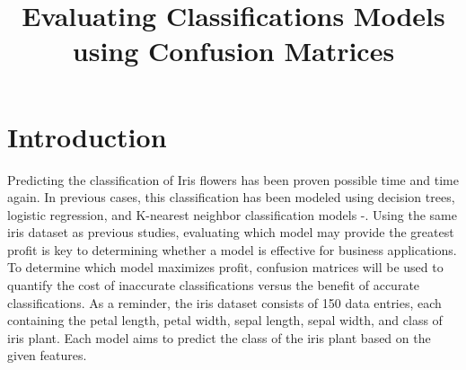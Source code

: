 \documentclass[journal]{IEEEtran}
\begin{document}
\setlength{\emergencystretch}{12pt}
\setlength{\parindent}{10pt}



\lstset{style=mystyle}

\title{Evaluating Classifications Models using Confusion Matrices}

\author{
}

\maketitle

\begin{abstract}
\label{log:abstract}
\end{abstract}

\section{Introduction}

Predicting the classification of Iris flowers has been proven possible time and time again. In previous cases, this classification has been modeled using decision trees, logistic regression, and K-nearest neighbor classification models \cite{b1}-\cite{b3}. Using the same iris dataset as previous studies, evaluating which model may provide the greatest profit is key to determining whether a model is effective for business applications. To determine which model maximizes profit, confusion matrices will be used to quantify the cost of inaccurate classifications versus the benefit of accurate classifications. As a reminder, the iris dataset consists of 150 data entries, each containing the petal length, petal width, sepal length, sepal width, and class of iris plant. Each model aims to predict the class of the iris plant based on the given features. 
\end{document}
